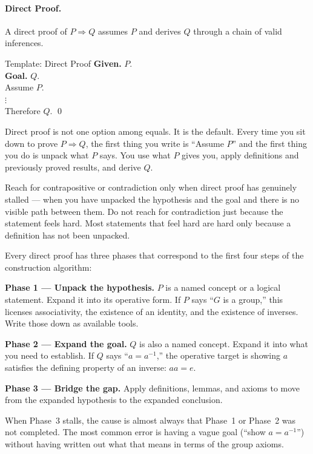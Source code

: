 \paragraph{Direct Proof.}

A direct proof of $P \Rightarrow Q$ assumes $P$ and derives $Q$
through a chain of valid inferences.

\begin{propositionbox}{Template: Direct Proof}
\textbf{Given.} $P$.\\
\textbf{Goal.} $Q$.\\[4pt]
Assume $P$.\\
$\vdots$ \\
Therefore $Q$. \qed
\end{propositionbox}

\begin{remark}
Direct proof is not one option among equals. It is the default.
Every time you sit down to prove $P \Rightarrow Q$, the first thing you
write is ``Assume $P$'' and the first thing you do is unpack what $P$
says. You use what $P$ gives you, apply definitions and previously proved
results, and derive $Q$.

Reach for contrapositive or contradiction only when direct proof has
genuinely stalled --- when you have unpacked the hypothesis and the goal
and there is no visible path between them. Do not reach for contradiction
just because the statement feels hard. Most statements that feel hard
are hard only because a definition has not been unpacked.
\end{remark}

\begin{remark}
Every direct proof has three phases that correspond to the first four
steps of the construction algorithm:

\medskip
\noindent \textbf{Phase 1 --- Unpack the hypothesis.} $P$ is a named
concept or a logical statement. Expand it into its operative form.
If $P$ says ``$G$ is a group,'' this licenses associativity, the
existence of an identity, and the existence of inverses. Write those
down as available tools.

\medskip
\noindent \textbf{Phase 2 --- Expand the goal.} $Q$ is also a named
concept. Expand it into what you need to establish. If $Q$ says
``$a = a^{-1}$,'' the operative target is showing $a$ satisfies the
defining property of an inverse: $aa = e$.

\medskip
\noindent \textbf{Phase 3 --- Bridge the gap.} Apply definitions,
lemmas, and axioms to move from the expanded hypothesis to the
expanded conclusion.

\medskip
\noindent When Phase~3 stalls, the cause is almost always that Phase~1
or Phase~2 was not completed. The most common error is having a vague
goal (``show $a = a^{-1}$'') without having written out what that means
in terms of the group axioms.
\end{remark}

